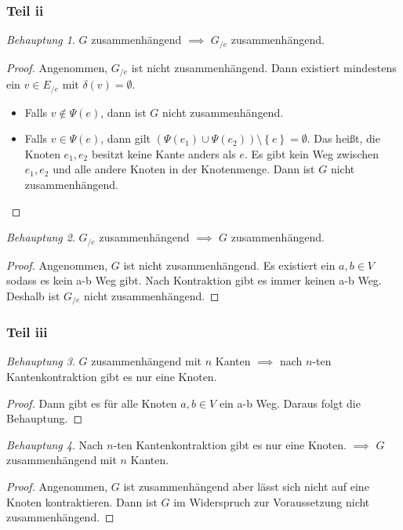\documentclass[a5paper]{article}
\theoremstyle{remark}
\newtheorem*{Behauptung}{Behauptung}
\begin{document}
\subsubsection{Teil ii}
\begin{Behauptung}
  \(G\) zusammenhängend \(\implies\) \(G_{/e}\) zusammenhängend.
\end{Behauptung}
\begin{proof}
    Angenommen, \(G_{/e}\) ist nicht zusammenhängend.  Dann existiert
  mindestens ein \(v \in E_{/e}\) mit \(\delta(v) = \emptyset\).
  \begin{itemize}
  \item   Falls \(v \notin \Psi(e)\), dann ist \(G\) nicht
    zusammenhängend.
  \item   Falls \(v \in \Psi(e)\), dann gilt
  $(\Psi(e_1) \cup \Psi(e_2)) \setminus \left\{ e \right\} =
  \emptyset$.  Das heißt, die Knoten \(e_1, e_2\) besitzt keine Kante
  anders als \(e\).  Es gibt kein Weg zwischen \(e_1, e_2\) und alle
  andere Knoten in der Knotenmenge.  Dann ist \(G\) nicht
  zusammenhängend.
  \end{itemize}
\end{proof}
\begin{Behauptung}
  \(G_{/e}\) zusammenhängend \(\implies\) \(G\) zusammenhängend.
\end{Behauptung}
\begin{proof}
    Angenommen, \(G\) ist nicht zusammenhängend.  Es existiert ein $a, b
  \in V$ sodass es kein a-b Weg gibt.  Nach Kontraktion gibt es immer
  keinen a-b Weg.  Deshalb ist \(G_{/e}\) nicht zusammenhängend.
\end{proof}
\subsubsection{Teil iii}
\begin{Behauptung}
  \(G\) zusammenhängend mit \(n\) Kanten \(\implies\) nach \(n\)-ten
Kantenkontraktion gibt es nur eine Knoten.
\end{Behauptung}
\begin{proof}
    Dann gibt es für alle Knoten \(a, b \in V\) ein a-b Weg.  Daraus folgt
  die Behauptung.
\end{proof}
\begin{Behauptung}
  Nach \(n\)-ten Kantenkontraktion gibt es nur eine Knoten. \(\implies\) \(G\)
zusammenhängend mit \(n\) Kanten.
\end{Behauptung}
\begin{proof}
    Angenommen, \(G\) ist zusammenhängend aber lässt sich nicht auf eine
  Knoten kontraktieren.  Dann ist \(G\) im Widerspruch zur Voraussetzung
  nicht zusammenhängend.
\end{proof}
\end{document}
